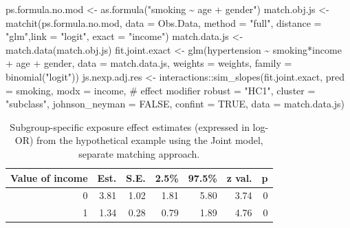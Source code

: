 \documentclass[
  letterpaper,
  DIV=11,
  numbers=noendperiod]{scrreprt}
\newenvironment{Shaded}{\begin{snugshade}}{\end{snugshade}}
\newcommand{\AttributeTok}[1]{\textcolor[rgb]{0.40,0.45,0.13}{#1}}
\newcommand{\CommentTok}[1]{\textcolor[rgb]{0.37,0.37,0.37}{#1}}
\newcommand{\ConstantTok}[1]{\textcolor[rgb]{0.56,0.35,0.01}{#1}}
\newcommand{\FunctionTok}[1]{\textcolor[rgb]{0.28,0.35,0.67}{#1}}
\newcommand{\NormalTok}[1]{\textcolor[rgb]{0.00,0.23,0.31}{#1}}
\newcommand{\OtherTok}[1]{\textcolor[rgb]{0.00,0.23,0.31}{#1}}
\newcommand{\SpecialCharTok}[1]{\textcolor[rgb]{0.37,0.37,0.37}{#1}}
\newcommand{\StringTok}[1]{\textcolor[rgb]{0.13,0.47,0.30}{#1}}
\begin{document}
\begin{Shaded}
\begin{Highlighting}[]
\NormalTok{ps.formula.no.mod }\OtherTok{\textless{}{-}} \FunctionTok{as.formula}\NormalTok{(}\StringTok{"smoking \textasciitilde{} age + gender"}\NormalTok{)}
\NormalTok{match.obj.js }\OtherTok{\textless{}{-}} \FunctionTok{matchit}\NormalTok{(ps.formula.no.mod, }\AttributeTok{data =}\NormalTok{ Obs.Data,}
                        \AttributeTok{method =} \StringTok{"full"}\NormalTok{, }\AttributeTok{distance =} \StringTok{"glm"}\NormalTok{,}\AttributeTok{link =} \StringTok{"logit"}\NormalTok{,}
                        \AttributeTok{exact =} \StringTok{"income"}\NormalTok{)}
\NormalTok{match.data.js }\OtherTok{\textless{}{-}} \FunctionTok{match.data}\NormalTok{(match.obj.js)}
\NormalTok{fit.joint.exact }\OtherTok{\textless{}{-}} \FunctionTok{glm}\NormalTok{(hypertension }\SpecialCharTok{\textasciitilde{}}\NormalTok{ smoking}\SpecialCharTok{*}\NormalTok{income }\SpecialCharTok{+}\NormalTok{ age }\SpecialCharTok{+}\NormalTok{ gender, }
                       \AttributeTok{data =}\NormalTok{ match.data.js, }\AttributeTok{weights =}\NormalTok{ weights,}
                       \AttributeTok{family =} \FunctionTok{binomial}\NormalTok{(}\StringTok{"logit"}\NormalTok{))}
\NormalTok{js.nexp.adj.res }\OtherTok{\textless{}{-}}\NormalTok{ interactions}\SpecialCharTok{::}\FunctionTok{sim\_slopes}\NormalTok{(fit.joint.exact, }
                                            \AttributeTok{pred =}\NormalTok{ smoking, }
                                            \AttributeTok{modx =}\NormalTok{ income, }\CommentTok{\# effect modifier}
                                            \AttributeTok{robust =} \StringTok{"HC1"}\NormalTok{, }
                                            \AttributeTok{cluster =} \StringTok{"subclass"}\NormalTok{,}
                                            \AttributeTok{johnson\_neyman =} \ConstantTok{FALSE}\NormalTok{, }
                                            \AttributeTok{confint =} \ConstantTok{TRUE}\NormalTok{,}
                                            \AttributeTok{data =}\NormalTok{ match.data.js)}
\end{Highlighting}
\end{Shaded}

\hypertarget{tbl-joint-approach-sep}{}
\begin{table}[!h]
\caption{\label{tbl-joint-approach-sep}Subgroup-specific exposure effect estimates (expressed in log-OR) from
the hypothetical example using the Joint model, separate matching
approach. }\tabularnewline

\centering
\begin{tabular}{rrrrrrr}
\toprule
Value of income & Est. & S.E. & 2.5\% & 97.5\% & z val. & p\\
\midrule
0 & 3.81 & 1.02 & 1.81 & 5.80 & 3.74 & 0\\
1 & 1.34 & 0.28 & 0.79 & 1.89 & 4.76 & 0\\
\bottomrule
\end{tabular}
\end{table}
\end{document}

